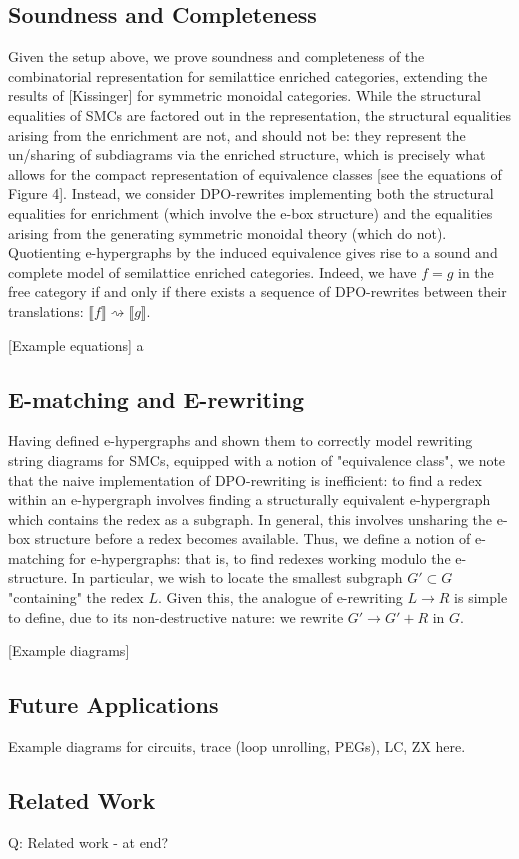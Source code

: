 \subsection*{Soundness and Completeness}
Given the setup above, we prove soundness and completeness of the combinatorial representation for semilattice enriched categories, extending the results of [Kissinger] for symmetric monoidal categories. While the structural equalities of SMCs are factored out in the representation, the structural equalities arising from the enrichment are not, and should not be: they represent the un/sharing of subdiagrams via the enriched structure, which is precisely what allows for the compact representation of equivalence classes [see the equations of Figure 4]. Instead, we consider DPO-rewrites implementing both the structural equalities for enrichment (which involve the e-box structure) and the equalities arising from the generating symmetric monoidal theory (which do not). Quotienting e-hypergraphs by the induced equivalence gives rise to a sound and complete model of semilattice enriched categories. Indeed, we have $f = g$ in the free category if and only if there exists a sequence of DPO-rewrites between their translations: $\llbracket f \rrbracket \rightsquigarrow \llbracket g \rrbracket$. 

[Example equations]
a
\subsection*{E-matching and E-rewriting}

Having defined e-hypergraphs and shown them to correctly model rewriting string diagrams for SMCs, equipped with a notion of "equivalence class", we note that the naive implementation of DPO-rewriting is inefficient: to find a redex within an e-hypergraph involves finding a structurally equivalent e-hypergraph which contains the redex as a subgraph. In general, this involves unsharing the e-box structure before a redex becomes available. Thus, we define a notion of e-matching for e-hypergraphs: that is, to find redexes working modulo the e-structure. In particular, we wish to locate the smallest subgraph $G' \subset G$ "containing" the redex $L$. Given this, the analogue of e-rewriting $L \to R$ is simple to define, due to its non-destructive nature: we rewrite $G' \to G' + R$ in $G$. 

[Example diagrams]

\subsection*{Future Applications}

Example diagrams for circuits, trace (loop unrolling, PEGs), LC, ZX here.

\subsection{Related Work}
Q: Related work - at end? \\